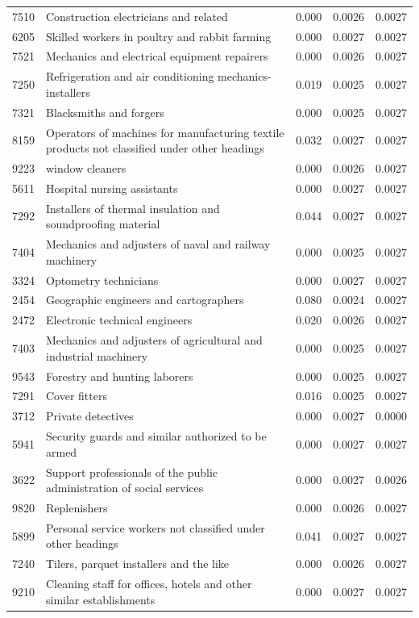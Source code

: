 \begin{longtable}{p{}>{\raggedright\arraybackslash}p{}rrr}
7510 & Construction electricians and related & 0.000 & 0.0026 & 0.0027 \\
6205 & Skilled workers in poultry and rabbit farming & 0.000 & 0.0027 & 0.0027 \\
7521 & Mechanics and electrical equipment repairers & 0.000 & 0.0026 & 0.0027 \\
7250 & Refrigeration and air conditioning mechanics-installers & 0.019 & 0.0025 & 0.0027 \\
7321 & Blacksmiths and forgers & 0.000 & 0.0025 & 0.0027 \\
8159 & Operators of machines for manufacturing textile products not classified under other headings & 0.032 & 0.0027 & 0.0027 \\
9223 & window cleaners & 0.000 & 0.0026 & 0.0027 \\
5611 & Hospital nursing assistants & 0.000 & 0.0027 & 0.0027 \\
7292 & Installers of thermal insulation and soundproofing material & 0.044 & 0.0027 & 0.0027 \\
7404 & Mechanics and adjusters of naval and railway machinery & 0.000 & 0.0025 & 0.0027 \\
3324 & Optometry technicians & 0.000 & 0.0027 & 0.0027 \\
2454 & Geographic engineers and cartographers & 0.080 & 0.0024 & 0.0027 \\
2472 & Electronic technical engineers & 0.020 & 0.0026 & 0.0027 \\
7403 & Mechanics and adjusters of agricultural and industrial machinery & 0.000 & 0.0025 & 0.0027 \\
9543 & Forestry and hunting laborers & 0.000 & 0.0025 & 0.0027 \\
7291 & Cover fitters & 0.016 & 0.0025 & 0.0027 \\
3712 & Private detectives & 0.000 & 0.0027 & 0.0000 \\
5941 & Security guards and similar authorized to be armed & 0.000 & 0.0027 & 0.0027 \\
3622 & Support professionals of the public administration of social services & 0.000 & 0.0027 & 0.0026 \\
9820 & Replenishers & 0.000 & 0.0026 & 0.0027 \\
5899 & Personal service workers not classified under other headings & 0.041 & 0.0027 & 0.0027 \\
7240 & Tilers, parquet installers and the like & 0.000 & 0.0026 & 0.0027 \\
9210 & Cleaning staff for offices, hotels and other similar establishments & 0.000 & 0.0027 & 0.0027 \\

\end{longtable}
